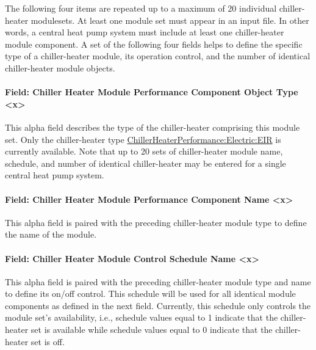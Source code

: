 The following four items are repeated up to a maximum of 20 individual chiller-heater modulesets. At least one module set must appear in an input file. In other words, a central heat pump system must include at least one chiller-heater module component. A set of the following four fields helps to define the specific type of a chiller-heater module, its operation control, and the number of identical chiller-heater module objects.

\paragraph{Field: Chiller Heater Module Performance Component Object Type \textless{}x\textgreater{}}\label{field-chiller-heater-module-performance-component-object-type-x}

This alpha field describes the type of the chiller-heater comprising this module set. Only the chiller-heater type \hyperref[chillerheaterperformancelectriceir]{ChillerHeaterPerformance:Electric:EIR} is currently available. Note that up to 20 sets of chiller-heater module name, schedule, and number of identical chiller-heater may be entered for a single central heat pump system.

\paragraph{Field: Chiller Heater Module Performance Component Name \textless{}x\textgreater{}}\label{field-chiller-heater-module-performance-component-name-x}

This alpha field is paired with the preceding chiller-heater module type to define the name of the module.

\paragraph{Field: Chiller Heater Module Control Schedule Name \textless{}x\textgreater{}}\label{field-chiller-heater-module-control-schedule-name-x}

This alpha field is paired with the preceding chiller-heater module type and name to define its on/off control. This schedule will be used for all identical module components as defined in the next field. Currently, this schedule only controls the module set's availability, i.e., schedule values equal to 1 indicate that the chiller-heater set is available while schedule values equal to 0 indicate that the chiller-heater set is off.

